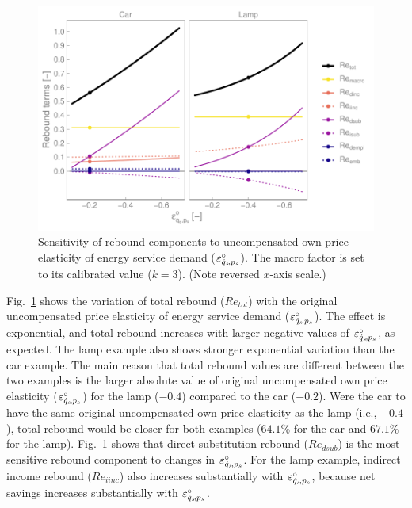 \documentclass[12pt]{article}\usepackage[]{graphicx}\usepackage[]{xcolor}
\makeatletter
\def\maxwidth{ %
  \ifdim\Gin@nat@width>\linewidth
    \linewidth
  \else
    \Gin@nat@width
  \fi
}
\newenvironment{knitrout}{}{} %
\makeatother
\begin{document}
\begin{knitrout}
\color{fgcolor}\begin{figure}

{\centering \includegraphics[width=\maxwidth]{figure/all_Re_terms_eps_graph-1} 

}

\caption[Sensitivity of rebound components to uncompensated own price elasticity of energy service demand ($\eqspsUCorig$)]{Sensitivity of rebound components to uncompensated own price elasticity of energy service demand ($\eqspsUCorig$). The macro factor is set to its calibrated value ($k = 3$). (Note reversed $x$-axis scale.)}\label{fig:all_Re_terms_eps_graph}
\end{figure}

\end{knitrout}
  
  


Fig.~\ref{fig:all_Re_terms_eps_graph} shows the variation of total rebound ($Re_{tot}$)
with the original uncompensated price elasticity of energy service demand ($\eqspsUCorig$).
The effect is exponential, and
total rebound increases with larger negative values of $\eqspsUCorig$, as expected.
The lamp example also shows stronger exponential variation than the car example.
The main reason that total rebound values 
are different between the two examples
is the larger absolute value of original uncompensated own price elasticity ($\eqspsUCorig$) 
for the lamp ($-0.4$) compared to the car ($-0.2$).
Were the car to have the same original uncompensated own price elasticity
as the lamp (i.e., $-0.4$), 
total rebound would be closer for both examples 
($64.1$\% for the car and 
$67.1$\% for the lamp).
Fig.~\ref{fig:all_Re_terms_eps_graph} shows that direct substitution rebound 
($Re_{dsub}$) is the most sensitive rebound component to changes in $\varepsilon_{\dot{q}_s\!,p_s}^\circ$.
For the lamp example, indirect income rebound ($Re_{iinc}$) also increases
substantially with $\varepsilon_{\dot{q}_s\!,p_s}^\circ$, 
because net savings increases substantially with $\varepsilon_{\dot{q}_s\!,p_s}^\circ$. 
\end{document}
